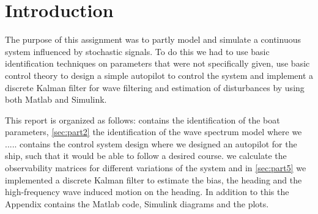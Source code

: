 
\section*{Introduction}

The purpose of this assignment was to partly model and simulate a continuous system influenced by stochastic signals. To do this we had to use basic identification techniques on parameters that were not specifically given, use basic control theory to design a simple autopilot to control the system and implement a discrete Kalman filter for wave filtering and estimation of disturbances by using both Matlab and Simulink.

This report is organized as follows:  contains the identification of the boat parameters, \cref{sec:part2} the identification of the wave spectrum model where we ..... 
 contains the control system design where we designed an autopilot for the ship, such that it would be able to follow a desired course.  we calculate the observability matrices for different variations of the system and in \cref{sec:part5} we implemented a discrete Kalman filter to estimate the bias, the heading and the high-frequency wave induced motion on the heading. In addition to this the Appendix contains the Matlab code, Simulink diagrams and the plots. 
